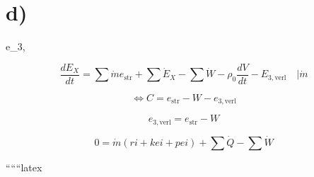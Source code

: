

\section*{d)}
 \quad e_{3, }

 \quad {} \rightarrow {} \quad {}

\[
\frac{dE_X}{dt} = \sum \dot{m} e_{\text{str}} + \sum \dot{E}_X - \sum \dot{W} - \rho_0 \frac{dV}{dt} - E_{3, \text{verl}} \quad \Bigg| \dot{m}
\]

\[
\Leftrightarrow C = e_{\text{str}} - W - e_{3, \text{verl}}
\]

\[
e_{3, \text{verl}} = e_{\text{str}} - W
\]

 \quad {} \rightarrow {}

\[
0 = \dot{m} (ri + kei + pei) + \sum \dot{Q} - \sum \dot{W}
\]

``````latex
